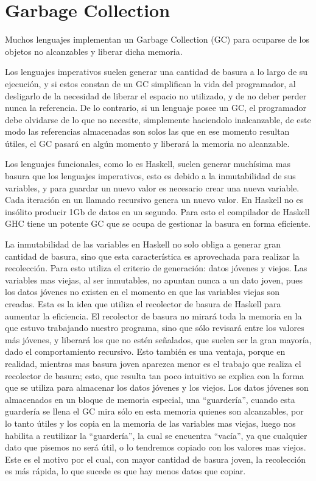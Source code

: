 
\section{Garbage Collection} %
\label{sec:garbage_collection}

Muchos lenguajes implementan un Garbage Collection (GC) para ocuparse de los objetos no alcanzables y liberar dicha memoria.


Los lenguajes imperativos suelen generar una cantidad de basura a lo largo de su ejecución, y si estos constan de un GC simplifican la vida del programador, al desligarlo de la necesidad de liberar el espacio no utilizado, y de no deber perder nunca la referencia. De lo contrario, si un lenguaje posee un GC, el programador debe olvidarse de lo que no necesite, simplemente haciendolo inalcanzable, de este modo las referencias almacenadas son solos las que en ese momento resultan útiles, el GC pasará en algún momento y liberará la memoria no alcanzable.


Los lenguajes funcionales, como lo es Haskell, suelen generar muchísima mas basura que los lenguajes imperativos, esto es debido a la inmutabilidad de sus variables, y para guardar un nuevo valor es necesario crear una nueva variable. Cada iteración en un llamado recursivo genera un nuevo valor. En Haskell no es insólito producir 1Gb de datos en un segundo.
Para esto el compilador de Haskell GHC tiene un potente GC que se ocupa de gestionar la basura en forma eficiente.


La inmutabilidad de las variables en Haskell no solo obliga a generar gran cantidad de basura, sino que esta característica es aprovechada para realizar la recolección.
Para esto utiliza el criterio de generación: datos jóvenes y viejos. Las variables mas viejas, al ser inmutables, no apuntan nunca a un dato joven, pues los datos jóvenes no existen en el momento en que las variables viejas son creadas. Esta es la idea que utiliza el recolector de basura de Haskell para aumentar la eficiencia.
El recolector de basura no mirará toda la memoria en la que estuvo trabajando nuestro programa, sino que sólo revisará entre los valores más jóvenes, y liberará los que no estén señalados, que suelen ser la gran mayoría, dado el comportamiento recursivo. Esto también es una ventaja, porque en realidad, mientras mas basura joven aparezca menor es el trabajo que realiza el recolector de basura; esto, que resulta tan poco intuitivo se explica con la forma que se utiliza para almacenar los datos jóvenes y los viejos.
Los datos jóvenes son almacenados en un bloque de memoria especial, una “guardería”, cuando esta guardería se llena el GC mira sólo en esta memoria quienes son alcanzables, por lo tanto útiles y los copia en la memoria de las variables mas viejas, luego nos habilita a reutilizar la “guardería”, la cual se encuentra “vacía”, ya que cualquier dato que pisemos no será útil, o lo tendremos copiado con los valores mas viejos. Este es el motivo por el cual, con mayor cantidad de basura joven, la recolección es más rápida, lo que sucede es que hay menos datos que copiar.

